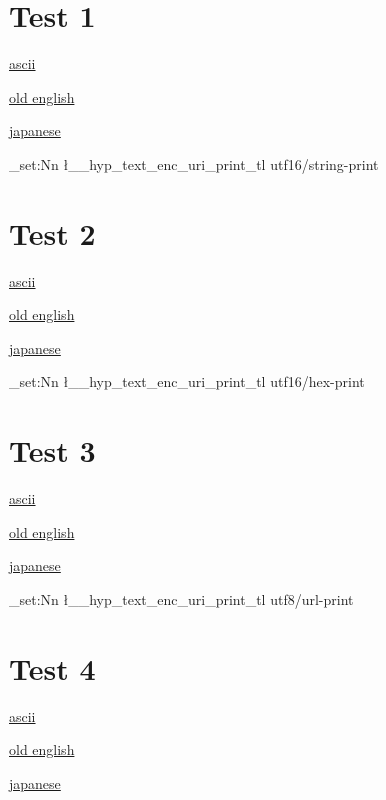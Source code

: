 \documentclass{article}
\begin{document}
\section{Test 1}
\href{https://www.latex-project.org/get/#tex-distributions}{ascii}

\href{https://ang.wikipedia.org/wiki/Elisabeþ_I_Engla_Cwēn}{old english}

\href{https://ja.wikipedia.org/wiki/エリザベス1世_(イングランド女王}{japanese}

\ExplSyntaxOn
\tl_set:Nn \l__hyp_text_enc_uri_print_tl  {utf16/string-print}
\ExplSyntaxOff

\section{Test 2}
\href{https://www.latex-project.org/get/#tex-distributions}{ascii}

\href{https://ang.wikipedia.org/wiki/Elisabeþ_I_Engla_Cwēn}{old english}

\href{https://ja.wikipedia.org/wiki/エリザベス1世_(イングランド女王}{japanese}

\ExplSyntaxOn
\tl_set:Nn \l__hyp_text_enc_uri_print_tl  {utf16/hex-print}
\ExplSyntaxOff

\section{Test 3}
\href{https://www.latex-project.org/get/#tex-distributions}{ascii}

\href{https://ang.wikipedia.org/wiki/Elisabeþ_I_Engla_Cwēn}{old english}

\href{https://ja.wikipedia.org/wiki/エリザベス1世_(イングランド女王}{japanese}

\ExplSyntaxOn
\tl_set:Nn \l__hyp_text_enc_uri_print_tl  {utf8/url-print}
\ExplSyntaxOff

\section{Test 4}
\href{https://www.latex-project.org/get/#tex-distributions}{ascii}

\href{https://ang.wikipedia.org/wiki/Elisabeþ_I_Engla_Cwēn}{old english}

\href{https://ja.wikipedia.org/wiki/エリザベス1世_(イングランド女王}{japanese}
\end{document}
